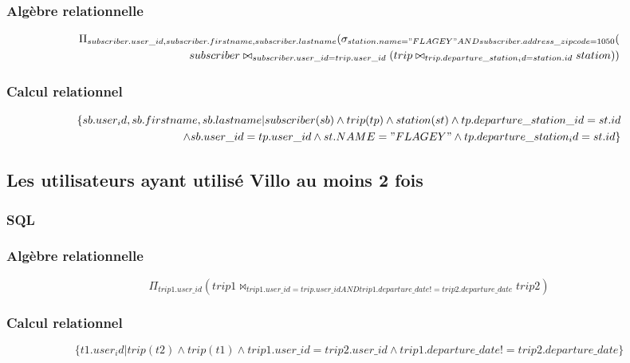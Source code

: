\documentclass[a4paper,10pt]{article}
\begin{document}
\subsubsection{Algèbre relationnelle}
\begin{align}
\Pi_{subscriber.user\_id, subscriber.firstname, subscriber.lastname}(\sigma_{station.name="FLAGEY" AND subscriber.address\_zipcode=1050}(\\ subscriber\bowtie_{subscriber.user\_id = trip.user\_id} (trip \bowtie_{trip.departure\_station_id = station.id} station))
\end{align}
\subsubsection{Calcul relationnel}
\begin{align}
	\{ sb.user_id, sb.firstname, sb.lastname | subscriber(sb) \wedge trip(tp) \wedge station(st) \wedge tp.departure\_station\_id = st.id \\ \wedge sb.user\_id = tp.user\_id \wedge st.NAME = "FLAGEY" \wedge tp.departure\_station_id = st.id \}
\end{align}

\subsection{Les utilisateurs ayant utilisé Villo au moins 2 fois}
\subsubsection{SQL}


\subsubsection{Algèbre relationnelle}
\begin{displaymath}
\Pi_{trip1.user\_id}( trip1 \bowtie_{trip1.user\_id = trip.user\_id AND trip1.departure\_date != trip2.departure\_date} trip2)
\end{displaymath}
\subsubsection{Calcul relationnel}
\begin{displaymath}
	\{ t1.user_id | trip(t2) \wedge trip(t1) \wedge trip1.user\_id = trip2.user\_id
\wedge trip1.departure\_date != trip2.departure\_date \}
\end{displaymath}
\end{document}
